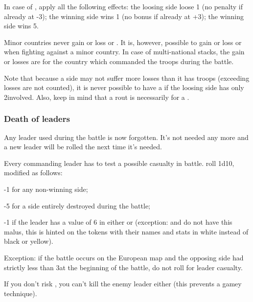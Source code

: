 \aparag In case of , apply all the following effects:
\bparag the loosing side loose 1 \STAB (no penalty if already at -3);
\bparag the winning side wins 1 \STAB (no bonus if already at +3);
\bparag the winning side wins 5\VPs.

Minor countries never gain or loss \STAB or \VPs. It is, however, possible to
gain or loss \STAB or \VPs when fighting against a minor country. In case of
multi-national stacks, the gain or losses are for the country which commanded
the troops during the battle.

\begin{designnote}
  Note that because a side may not suffer more losses than it has troops
  (exceeding losses are not counted), it is never possible to have a
   if the loosing side has only 2\LD involved. Also, keep
  in mind that a rout is necessarily for a .
\end{designnote}

\subsubsection{Death of leaders}
Any  leader used during the battle is now forgotten. It's
not needed any more and a new  leader will be rolled the
next time it's needed.

Every commanding leader has to test a possible casualty in battle. roll 1d10,
modified as follows:
\begin{modlist}
\item[-1] for any non-winning side;
\item[-5] for a side entirely destroyed during the battle;
\item[-1] if the leader has a value of 6 in either \Fire or \Shock (exception:
   and  do not have this malus, this
  is hinted on the tokens with their names and stats in white instead of black
  or yellow).
\end{modlist}

Exception: if the battle occurs on the European map and the opposing side had
strictly less than 3\LD at the beginning of the battle, do not roll for leader
casualty.

\begin{designnote}
  If you don't risk , you can't kill the enemy leader
  either (this prevents a gamey technique).
\end{designnote}

